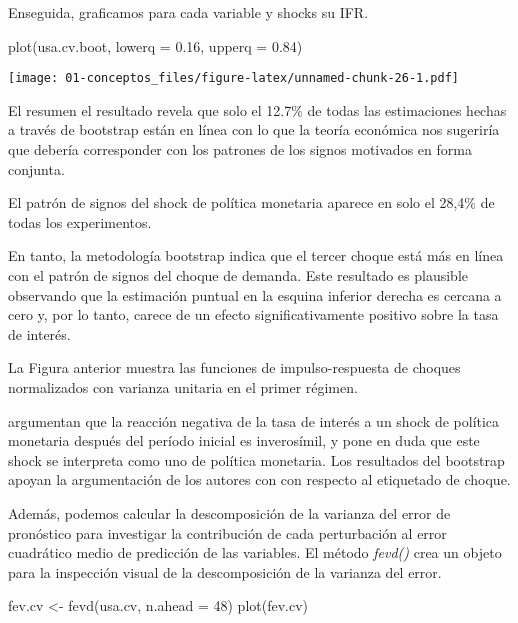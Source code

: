 \documentclass[
]{book}
\newenvironment{Shaded}{\begin{snugshade}}{\end{snugshade}}
\newcommand{\AttributeTok}[1]{\textcolor[rgb]{0.77,0.63,0.00}{#1}}
\newcommand{\DecValTok}[1]{\textcolor[rgb]{0.00,0.00,0.81}{#1}}
\newcommand{\FloatTok}[1]{\textcolor[rgb]{0.00,0.00,0.81}{#1}}
\newcommand{\FunctionTok}[1]{\textcolor[rgb]{0.00,0.00,0.00}{#1}}
\newcommand{\NormalTok}[1]{#1}
\newcommand{\OtherTok}[1]{\textcolor[rgb]{0.56,0.35,0.01}{#1}}
\begin{document}
Enseguida, graficamos para cada variable y shocks su IFR.

\begin{Shaded}
\begin{Highlighting}[]
\FunctionTok{plot}\NormalTok{(usa.cv.boot, }\AttributeTok{lowerq =} \FloatTok{0.16}\NormalTok{, }\AttributeTok{upperq =} \FloatTok{0.84}\NormalTok{)}
\end{Highlighting}
\end{Shaded}

\texttt{[image: 01-conceptos\_files/figure-latex/unnamed-chunk-26-1.pdf]}

El resumen el resultado revela que solo el 12.7\% de todas las estimaciones hechas a través de bootstrap están en línea con lo que la teoría económica nos sugeriría que debería corresponder con los patrones de los signos motivados en forma conjunta.

El patrón de signos del shock de política monetaria aparece en solo el 28,4\% de todas los experimentos.

En tanto, la metodología bootstrap indica que el tercer choque está más en línea con el patrón de signos del choque de demanda. Este resultado es plausible observando que la estimación puntual en la esquina inferior derecha es cercana a cero y, por lo tanto, carece de un efecto significativamente positivo sobre la tasa de interés.

La Figura anterior muestra las funciones de impulso-respuesta de choques normalizados con varianza unitaria en el primer régimen.

\citet{Herwartz2016} argumentan que la reacción negativa de la tasa de interés a un shock de política monetaria después del período inicial es inverosímil, y pone en duda que este shock se interpreta como uno de política monetaria. Los resultados del bootstrap apoyan la argumentación de los autores con
con respecto al etiquetado de choque.

Además, podemos calcular la descomposición de la varianza del error de pronóstico para investigar la contribución de cada perturbación al error cuadrático medio de predicción de las variables. El método \emph{fevd()}
crea un objeto para la inspección visual de la descomposición de la varianza del error.

\begin{Shaded}
\begin{Highlighting}[]
\NormalTok{fev.cv }\OtherTok{\textless{}{-}} \FunctionTok{fevd}\NormalTok{(usa.cv, }\AttributeTok{n.ahead =} \DecValTok{48}\NormalTok{)}
\FunctionTok{plot}\NormalTok{(fev.cv)}
\end{Highlighting}
\end{Shaded}
\end{document}
